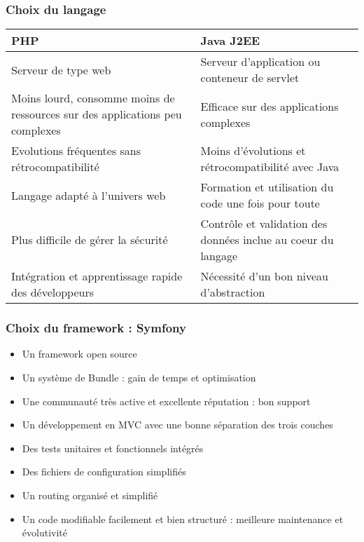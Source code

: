 \begin{frame}
  \frametitle{Choix du langage}
  \begin{center}
    \begin{tabular}[h]{|p{}|p{}|}
	\hline
	\cellcolor{blue!15}PHP & \cellcolor{blue!15}Java J2EE \\\hline
        Serveur de type web & Serveur d'application ou conteneur de servlet \\\hline
        Moins lourd, consomme moins de ressources sur des applications peu complexes & Efficace sur des applications complexes \\\hline
        Evolutions fréquentes sans rétrocompatibilité & Moins d'évolutions et rétrocompatibilité avec Java \\\hline
        Langage adapté à l'univers web & Formation et utilisation du code une fois pour toute \\\hline
        Plus difficile de gérer la sécurité & Contrôle et validation des données inclue au coeur du langage \\\hline
        Intégration et apprentissage rapide des développeurs & Nécessité d'un bon niveau d'abstraction \\\hline
    \end{tabular}
  \end{center}
\end{frame}

\begin{frame}
  \frametitle{Choix du framework : Symfony}
  \begin{itemize}
    \item Un framework open source
    \item Un système de Bundle : gain de temps et optimisation
    \item Une communauté très active et excellente réputation : bon support  
    \item Un développement en MVC avec une bonne séparation des trois couches
    \item Des tests unitaires et fonctionnels intégrés
    \item Des fichiers de configuration simplifiés
    \item Un routing organisé et simplifié
    \item Un code modifiable facilement et bien structuré : meilleure maintenance et évolutivité
  \end{itemize}
\end{frame}
